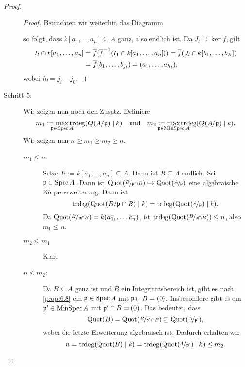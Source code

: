\documentclass[12pt,a4paper]{scrartcl}
\theoremstyle{cplain}
\theoremstyle{cdef}
\begin{document}
\begin{proof}
\begin{description}
\begin{proof}
			Betrachten wir weiterhin das Diagramm
			\begin{center}
			\end{center}
			so folgt, dass $k[a_1,\ldots,a_n] \subseteq A$ ganz, also endlich ist. Da $J_t \supseteq \ker f$, gilt \begin{align*}
				I_l\cap k[a_1,\dots, a_n] &= \overline{f}(\overline{f}^{-1}(I_1\cap k[a_1,\dots, a_n])) = \overline{f}(J_l\cap k[b_1,\dots, b_N]) \\ &= \overline{f}(b_1,\dots, b_{j_l}) = (a_1,\dots, a_{h_l}),
			\end{align*}
			wobei $h_l = j_l-j_0$.
		\end{proof}
		
		\item[Schritt 5:] Wir zeigen nun noch den Zusatz. Definiere \[m_1 := \max_{\mathclap{\fp\in \Spec A}}\trdeg(Q(A/\fp)\mid k) \quad\text{und}\quad m_2 := \max_{\mathclap{\fp\in\MinSpec A}} \trdeg(Q(A/\fp)\mid k).\]
		Wir zeigen nun $n\ge m_1\ge m_2\ge n$.
		\begin{description}
			\item[$m_1 \le n$:] Setze $B := k[a_1,\dots, a_n] \subseteq A$. Dann ist $B\subseteq A$ endlich. Sei $\mathfrak{p}\in\operatorname{Spec} A$. Dann ist $\operatorname{Quot}(\nicefrac{B}{\mathfrak{p}\cap B})\hookrightarrow \operatorname{Quot}(\nicefrac{A}{\mathfrak{p}})$ eine algebraische Körpererweiterung. Dann ist
			\[\operatorname{trdeg}(\operatorname{Quot}(B/\mathfrak{p}\cap B)\mid k) = \operatorname{trdeg}(\operatorname{Quot}(\nicefrac{A}{\mathfrak{p}})\mid k).\]
			Da $\operatorname{Quot}(\nicefrac{B}{\mathfrak{p}\cap B}) = k(\overline{a_1},\dots, \overline{a_n})$, ist $\operatorname{trdeg}(\operatorname{Quot}(\nicefrac{B}{\mathfrak{p}\cap B}))\le n$, also $m_1\le n$.
			\item[$m_2 \le m_1$] Klar.
			\item[$n \le m_2$:] Da $B\subseteq A$ ganz ist und $B$ ein Integritätsbereich ist, gibt es nach \cref{prop:6.8} ein $\mathfrak{p}\in \operatorname{Spec} A$ mit $\mathfrak{p}\cap B = (0)$. Insbesondere gibt es ein $\mathfrak{p}' \in \operatorname{MinSpec} A$ mit $\mathfrak{p}'\cap B = (0)$. Das bedeutet, dass
			\[\operatorname{Quot}(B) = \operatorname{Quot}(\nicefrac{B}{\mathfrak{p}'\cap B})\subseteq \operatorname{Quot}(\nicefrac{A}{\mathfrak{p}'}),\]
			wobei die letzte Erweiterung algebraisch ist. Dadurch erhalten wir
			\[ n = \operatorname{trdeg}(\operatorname{Quot}(B)\mid k) = \operatorname{trdeg}(\operatorname{Quot}(\nicefrac{A}{\mathfrak{p}'})\mid k) \le m_2.\qedhere\]
		\end{description}
	\end{description}
\end{proof}
\end{document}
